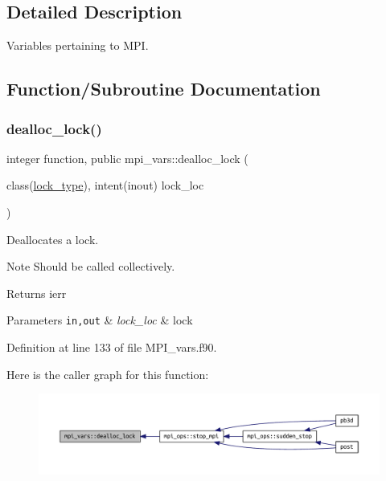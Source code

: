 \subsection{Detailed Description}
Variables pertaining to M\+PI. 

\subsection{Function/\+Subroutine Documentation}
\mbox{\label{namespacempi__vars_af03c942b5f1c980adf9e1b2ba3f4bd58}} 
\subsubsection{\texorpdfstring{dealloc\+\_\+lock()}{dealloc\_lock()}}
{\footnotesize\ttfamily integer function, public mpi\+\_\+vars\+::dealloc\+\_\+lock (\begin{DoxyParamCaption}\item[{class(\hyperlink{structmpi__vars_1_1lock__type}{lock\+\_\+type}), intent(inout)}]{lock\+\_\+loc }\end{DoxyParamCaption})}



Deallocates a lock. 

\begin{DoxyNote}{Note}
Should be called collectively.
\end{DoxyNote}
\begin{DoxyReturn}{Returns}
ierr
\end{DoxyReturn}

\begin{DoxyParams}[1]{Parameters}
\mbox{\tt in,out}  & {\em lock\+\_\+loc} & lock \\
\hline
\end{DoxyParams}


Definition at line 133 of file M\+P\+I\+\_\+vars.\+f90.

Here is the caller graph for this function\+:\nopagebreak
\begin{figure}[H]
\begin{center}
\leavevmode
\includegraphics[width=350pt]{namespacempi__vars_af03c942b5f1c980adf9e1b2ba3f4bd58_icgraph}
\end{center}
\end{figure}
\mbox{\label{namespacempi__vars_ab38aeec20e567cf6f272587890ead066}} 
